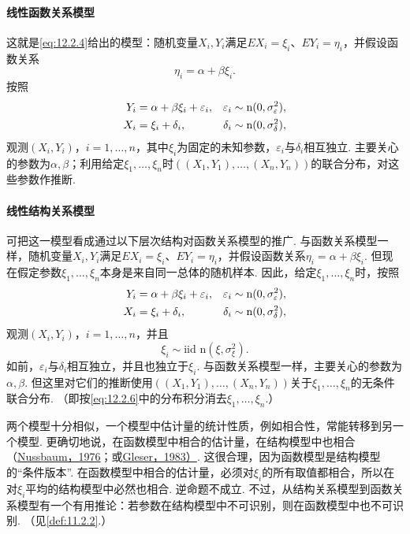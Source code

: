 \paragraph{线性函数关系模型}
这就是\eqref{eq:12.2.4}给出的模型：随机变量$X_i,Y_i$满足$EX_i=\xi_i$、$EY_i=\eta_i$，并假设函数关系
$$\eta_i=\alpha+\beta\xi_i.$$
按照
\begin{equation}\label{eq:12.2.5}\index{SI0410@函数关系}
\begin{aligned}Y_i&=\alpha+\beta\xi_i+\varepsilon_i,&\varepsilon_i&\sim\mathrm n(0,\sigma_\varepsilon^2),\\
X_i&=\xi_i+\delta_i,&\delta_i&\sim\mathrm n(0,\sigma_\delta^2),
\end{aligned}
\end{equation}
观测$(X_i,Y_i)$，$i=1,\ldots,n$，其中$\xi_i$为固定的未知参数，$\varepsilon_i$与$\delta_i$相互独立. 主要关心的参数为$\alpha,\beta$；利用给定$\xi_1,\ldots,\xi_n$时$((X_1,Y_1),\allowbreak\ldots,\allowbreak(X_n,Y_n))$的联合分布，对这些参数作推断.

\paragraph{线性结构关系模型}
可把这一模型看成通过以下层次结构对函数关系模型的推广. 与函数关系模型一样，随机变量$X_i,Y_i$满足$EX_i=\xi_i$、$EY_i=\eta_i$，并假设函数关系$\eta_i=\alpha+\beta\xi_i$. 但现在假定参数$\xi_1,\ldots,\xi_n$本身是来自同一总体的随机样本. 因此，给定$\xi_1,\ldots,\xi_n$时，按照
\begin{equation}\label{eq:12.2.6}\index{SI0417@结构关系}
\begin{aligned}Y_i&=\alpha+\beta\xi_i+\varepsilon_i,&\varepsilon_i&\sim\mathrm n(0,\sigma_\varepsilon^2),\\
X_i&=\xi_i+\delta_i,&\delta_i&\sim\mathrm n(0,\sigma_\delta^2),
\end{aligned}
\end{equation}
观测$(X_i,Y_i)$，$i=1,\ldots,n$，并且
$$\xi_i\sim\text{iid }\mathrm n(\xi,\sigma_\xi^2).$$
如前，$\varepsilon_i$与$\delta_i$相互独立，并且也独立于$\xi_i$. 与函数关系模型一样，主要关心的参数为$\alpha,\beta$. 但这里对它们的推断使用$((X_1,Y_1),\allowbreak\ldots,\allowbreak(X_n,Y_n))$关于$\xi_1,\ldots,\xi_n$的无条件联合分布. （即按\eqref{eq:12.2.6}中的分布积分消去$\xi_1,\ldots,\xi_n$.）

两个模型十分相似，一个模型中估计量的统计性质，例如相合性，常能转移到另一个模型. 更确切地说，在函数模型中相合的估计量，在结构模型中也相合（\hyperref[bib:source236]{Nussbaum，1976}；或\hyperref[bib:source144]{Gleser，1983）}.
这很合理，因为函数模型是结构模型的“条件版本”. 在函数模型中相合的估计量，必须对$\xi_i$的所有取值都相合，所以在对$\xi_i$平均的结构模型中必然也相合. 逆命题不成立. 不过，从结构关系模型到函数关系模型有一个有用推论：若参数在结构模型中不可识别，则在函数模型中也不可识别. （见\autoref{def:11.2.2}.）


